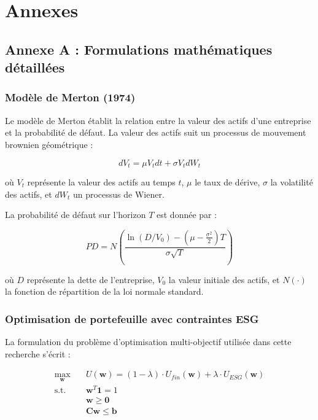 \chapter{Annexes}

\section{Annexe A : Formulations mathématiques détaillées}

\subsection{Modèle de Merton (1974)}

Le modèle de Merton établit la relation entre la valeur des actifs d'une entreprise et la probabilité de défaut. La valeur des actifs suit un processus de mouvement brownien géométrique :

\begin{equation}
dV_t = \mu V_t dt + \sigma V_t dW_t
\end{equation}

où $V_t$ représente la valeur des actifs au temps $t$, $\mu$ le taux de dérive, $\sigma$ la volatilité des actifs, et $dW_t$ un processus de Wiener.

La probabilité de défaut sur l'horizon $T$ est donnée par :

\begin{equation}
PD = N\left(\frac{\ln(D/V_0) - (\mu - \frac{\sigma^2}{2})T}{\sigma\sqrt{T}}\right)
\end{equation}

où $D$ représente la dette de l'entreprise, $V_0$ la valeur initiale des actifs, et $N(\cdot)$ la fonction de répartition de la loi normale standard.

\subsection{Optimisation de portefeuille avec contraintes ESG}

La formulation du problème d'optimisation multi-objectif utilisée dans cette recherche s'écrit :

\begin{align}
\max_{\mathbf{w}} \quad & U(\mathbf{w}) = (1-\lambda) \cdot U_{fin}(\mathbf{w}) + \lambda \cdot U_{ESG}(\mathbf{w}) \\
\text{s.t.} \quad & \mathbf{w}^T \mathbf{1} = 1 \\
& \mathbf{w} \geq \mathbf{0} \\
& \mathbf{C w} \leq \mathbf{b}
\end{align}

